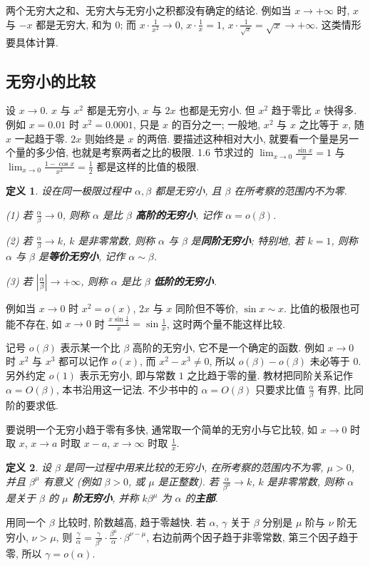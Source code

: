 \documentclass[UTF8,openany]{ctexbook}
\theoremstyle{chinesetextbook}
\newtheorem{definition}{定义}[section]
\begin{document}
两个无穷大之和、无穷大与无穷小之积都没有确定的结论. 例如当 $x\to+\infty$ 时, $x$ 与 $-x$ 都是无穷大, 和为 $0$; 而 $\displaystyle x\cdot\frac1{x^2}\to0$, $\displaystyle x\cdot\frac1x=1$, $\displaystyle x\cdot\frac1{\sqrt x}=\sqrt x\to+\infty$. 这类情形要具体计算.
\subsection{无穷小的比较}
设 $x\to0$. $x$ 与 $x^2$ 都是无穷小, $x$ 与 $2x$ 也都是无穷小. 但 $x^2$ 趋于零比 $x$ 快得多. 例如 $x=0.01$ 时 $x^2=0.0001$, 只是 $x$ 的百分之一; 一般地, $x^2$ 与 $x$ 之比等于 $x$, 随 $x$ 一起趋于零. $2x$ 则始终是 $x$ 的两倍. 要描述这种相对大小, 就要看一个量是另一个量的多少倍, 也就是考察两者之比的极限. 1.6 节求过的 $\displaystyle\lim_{x\to0}\frac{\sin x}x=1$ 与 $\displaystyle\lim_{x\to0}\frac{1-\cos x}{x^2}=\frac12$ 都是这样的比值的极限.
\begin{definition}
设在同一极限过程中 $\alpha,\beta$ 都是无穷小, 且 $\beta$ 在所考察的范围内不为零.

\textup{(1)} 若 $\displaystyle\frac\alpha\beta\to0$, 则称 $\alpha$ 是比 $\beta$ \textbf{高阶的无穷小}, 记作 $\alpha=o(\beta)$.

\textup{(2)} 若 $\displaystyle\frac\alpha\beta\to k$, $k$ 是非零常数, 则称 $\alpha$ 与 $\beta$ 是\textbf{同阶无穷小}; 特别地, 若 $k=1$, 则称 $\alpha$ 与 $\beta$ 是\textbf{等价无穷小}, 记作 $\alpha\sim\beta$.

\textup{(3)} 若 $\displaystyle\left|\frac\alpha\beta\right|\to+\infty$, 则称 $\alpha$ 是比 $\beta$ \textbf{低阶的无穷小}.
\end{definition}
例如当 $x\to0$ 时 $x^2=o(x)$, $2x$ 与 $x$ 同阶但不等价, $\sin x\sim x$. 比值的极限也可能不存在, 如 $x\to0$ 时 $\displaystyle\frac{x\sin\frac1x}x=\sin\frac1x$, 这时两个量不能这样比较.

记号 $o(\beta)$ 表示某一个比 $\beta$ 高阶的无穷小, 它不是一个确定的函数. 例如 $x\to0$ 时 $x^2$ 与 $x^3$ 都可以记作 $o(x)$, 而 $x^2-x^3\ne0$, 所以 $o(\beta)-o(\beta)$ 未必等于 $0$. 另外约定 $o(1)$ 表示无穷小, 即与常数 $1$ 之比趋于零的量. 教材把同阶关系记作 $\alpha=O(\beta)$, 本书沿用这一记法. 不少书中的 $\alpha=O(\beta)$ 只要求比值 $\displaystyle\frac\alpha\beta$ 有界, 比同阶的要求低.

要说明一个无穷小趋于零有多快, 通常取一个简单的无穷小与它比较, 如 $x\to0$ 时取 $x$, $x\to a$ 时取 $x-a$, $x\to\infty$ 时取 $\displaystyle\frac1x$.
\begin{definition}
设 $\beta$ 是同一过程中用来比较的无穷小, 在所考察的范围内不为零, $\mu>0$, 并且 $\beta^\mu$ 有意义 (例如 $\beta>0$, 或 $\mu$ 是正整数). 若 $\displaystyle\frac\alpha{\beta^\mu}\to k$, $k$ 是非零常数, 则称 $\alpha$ 是关于 $\beta$ 的 \textbf{$\mu$ 阶无穷小}, 并称 $k\beta^\mu$ 为 $\alpha$ 的\textbf{主部}.
\end{definition}
用同一个 $\beta$ 比较时, 阶数越高, 趋于零越快. 若 $\alpha$, $\gamma$ 关于 $\beta$ 分别是 $\mu$ 阶与 $\nu$ 阶无穷小, $\nu>\mu$, 则 $\displaystyle\frac\gamma\alpha=\frac\gamma{\beta^\nu}\cdot\frac{\beta^\mu}\alpha\cdot\beta^{\nu-\mu}$, 右边前两个因子趋于非零常数, 第三个因子趋于零, 所以 $\gamma=o(\alpha)$.
\end{document}
